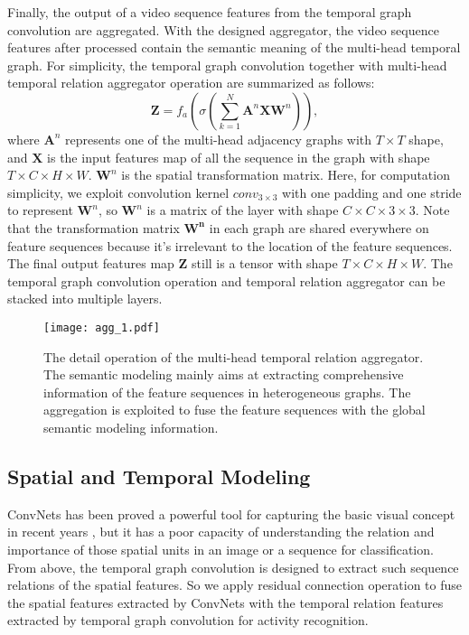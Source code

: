 \documentclass[conference,compsoc]{IEEEtran}
\begin{document}
     Finally, the output of a video sequence features from the temporal graph convolution are aggregated. With the designed aggregator, the video sequence features after processed contain the semantic meaning of the multi-head temporal graph. For simplicity, the temporal graph convolution together with multi-head temporal relation aggregator operation are summarized as follows:
    \begin{equation}
        \mathbf{Z} = f_a \left( \sigma \left( \sum_{k=1}^{N} \mathbf{A}^{n}\mathbf{X}\mathbf{W}^{n} \right) \right),
        \label{equ:sem_spe}
    \end{equation}
    where $\mathbf{A}^{n}$ represents one of the multi-head adjacency graphs with $T \times T$ shape, and $\mathbf{X}$ is the input features map of all the sequence in the graph with shape $T \times C \times H \times W$. $\mathbf{W}^{n}$ is the spatial transformation matrix. Here, for computation simplicity, we exploit convolution kernel $conv_{3\times3}$ with one padding and one stride to represent $\mathbf{W}^{n}$, so $\mathbf{W}^{n}$ is a matrix of the layer with shape $C \times C \times 3 \times 3$. Note that the transformation matrix $\mathbf{W^{n}}$ in each graph are shared everywhere on feature sequences because it's irrelevant to the location of the feature sequences. The final output features map $\mathbf{Z}$ still is a tensor with shape $T \times C \times H \times W$. The temporal graph convolution operation and temporal relation aggregator can be stacked into multiple layers.
    
    \vspace{-1.1em}
    \begin{figure}[h]
    \centering
    \texttt{[image: agg\_1.pdf]}
    \vspace{-0.1in}
    \caption{The detail operation of the multi-head temporal relation aggregator. The semantic modeling mainly aims at extracting comprehensive information of the feature sequences in heterogeneous graphs. The aggregation is exploited to fuse the feature sequences with the global semantic modeling information.}
    \label{fig:module2}
    \vspace{-1em}
    \end{figure}
    
    
\subsection{Spatial and Temporal Modeling}
    ConvNets has been proved a powerful tool for capturing the basic visual concept in recent years \cite{simonyan2014very, he2016deep, ren2017faster}, but it has a poor capacity of understanding the relation and importance of those spatial units in an image or a sequence for classification. From above, the temporal graph convolution is designed to extract such sequence relations of the spatial features. So we apply residual connection operation \cite{he2016deep} to fuse the spatial features extracted by ConvNets with the temporal relation features extracted by temporal graph convolution for activity recognition.
    
\end{document}
